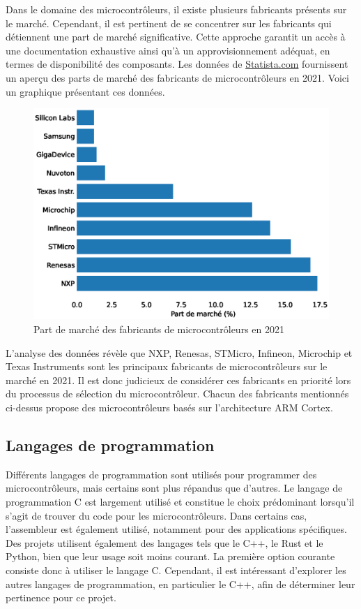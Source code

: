 Dans le domaine des microcontrôleurs, il existe plusieurs fabricants présents sur le marché.
Cependant, il est pertinent de se concentrer sur les fabricants qui détiennent une part de marché significative.
Cette approche garantit un accès à une documentation exhaustive ainsi qu'à un approvisionnement adéquat, en termes de disponibilité des composants.
Les données de \href{https://www.statista.com/statistics/1327509/top-mcu-suppliers-worldwide/}{Statista.com} fournissent un aperçu des parts de marché des fabricants de microcontrôleurs en 2021.
Voici un graphique présentant ces données.

\begin{figure}[H]
    \centering
    \includegraphics[width=12cm]{./assets/figures/topmcu.py.eps}
    \caption{Part de marché des fabricants de microcontrôleurs en 2021 }
    \label{fig:topmcu}
\end{figure}

L'analyse des données révèle que NXP, Renesas, STMicro, Infineon, Microchip et Texas Instruments sont les principaux fabricants de microcontrôleurs sur le marché en 2021.
Il est donc judicieux de considérer ces fabricants en priorité lors du processus de sélection du microcontrôleur.
Chacun des fabricants mentionnés ci-dessus propose des microcontrôleurs basés sur l'architecture ARM Cortex.

\subsection{Langages de programmation}

Différents langages de programmation sont utilisés pour programmer des microcontrôleurs, mais certains sont plus répandus que d'autres.
Le langage de programmation C est largement utilisé et constitue le choix prédominant lorsqu'il s'agit de trouver du code pour les microcontrôleurs.
Dans certains cas, l'assembleur est également utilisé, notamment pour des applications spécifiques.
Des projets utilisent également des langages tels que le C++, le Rust et le Python, bien que leur usage soit moins courant.
La première option courante consiste donc à utiliser le langage C.
Cependant, il est intéressant d'explorer les autres langages de programmation, en particulier le C++, afin de déterminer leur pertinence pour ce projet.

